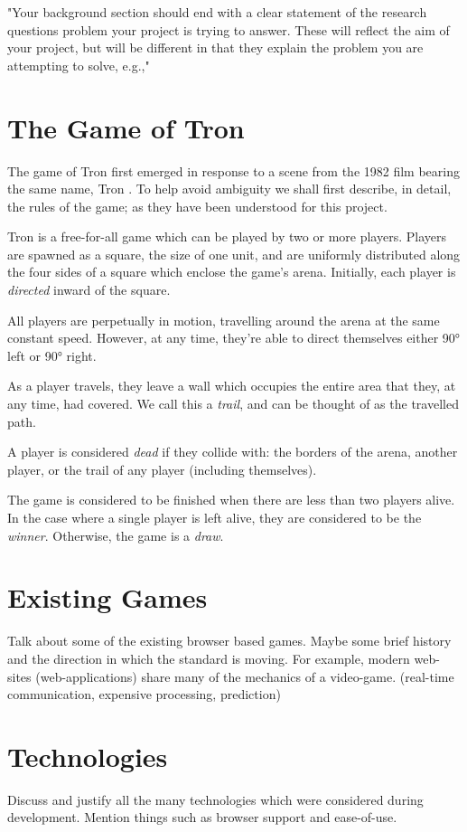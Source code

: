 \documentclass[class=article, crop=false]{standalone}
\begin{document}
	"Your background section should end with a clear statement of the research questions problem your project is trying to answer. These will reflect the aim of your project, but will be different in that they explain the problem you are attempting to solve, e.g.,"

	\section{The Game of Tron}
		The game of Tron first emerged in response to a scene from the 1982 film bearing the same name, Tron \parencite{TronLightCycleBattle}. To help avoid ambiguity we shall first describe, in detail, the rules of the game; as they have been understood for this project.

		Tron is a free-for-all game which can be played by two or more players. Players are spawned as a square, the size of one unit, and are uniformly distributed along the four sides of a square which enclose the game's arena. Initially, each player is \emph{directed} inward of the square.

		All players are perpetually in motion, travelling around the arena at the same constant speed. However, at any time, they're able to direct themselves either 90\si{\degree} left or 90\si{\degree} right.

		As a player travels, they leave a wall which occupies the entire area that they, at any time, had covered. We call this a \emph{trail}, and can be thought of as the travelled path.

		A player is considered \emph{dead} if they collide with: the borders of the arena, another player, or the trail of any player (including themselves).

		The game is considered to be finished when there are less than two players alive. In the case where a single player is left alive, they are considered to be the \emph{winner}. Otherwise, the game is a \emph{draw}.

	\section{Existing Games}
		Talk about some of the existing browser based games. Maybe some brief history and the direction in which the standard is moving. For example, modern web-sites (web-applications) share many of the mechanics of a video-game. (real-time communication, expensive processing, prediction)

	\section{Technologies}
		Discuss and justify all the many technologies which were considered during development. Mention things such as browser support and ease-of-use.
\end{document}
